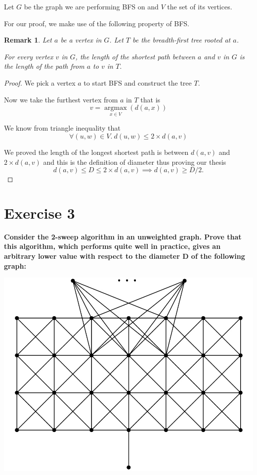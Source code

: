 \documentclass{article}
\newtheorem*{remark}{Remark}
\newcommand{\argmax}{\mathop{\mathrm{argmax}}\limits}
\begin{document}
Let \(G\) be the graph we are performing BFS on and \(V\) the set of its vertices.

For our proof, we make use of the following property of BFS.
\begin{remark}
	Let \(a\) be a vertex in \(G\). Let \(T\) be the breadth-first tree rooted at \(a\).

	\noindent For every vertex \(v\) in \(G\), the length of the shortest path between \(a\) and \(v\)
	in \(G\) is the length of the path from \(a\) to \(v\) in \(T\).
\end{remark}

\begin{proof}
	We pick a vertex \(a\) to start BFS and construct the tree \(T\).

	Now we take the furthest vertex from \(a\) in \(T\) that is
	\[v = \argmax_{x \in V}(d(a, x)) \]

	We know from triangle inequality that
	\[
		\forall (u, w) \in V. \ d(u, w) \leq 2 \times d(a, v)
	\]

	We proved the length of the longest shortest path is between \(d(a, v)\) and \(2 \times d(a, v)\) and this is
	the definition of diameter thus proving our thesis
	\[
		d(a, v) \leq D \leq 2 \times d(a, v) \implies d(a, v) \geq D/2.
	\]
\end{proof}

\pagebreak
\section*{Exercise 3}
\textbf{Consider the 2-sweep algorithm in an unweighted graph. Prove that this algorithm,
which performs quite well in practice, gives an arbitrary lower value with respect to the diameter D
of the following graph:}

\includegraphics[scale=0.36]{./images/graph.png}
\end{document}
